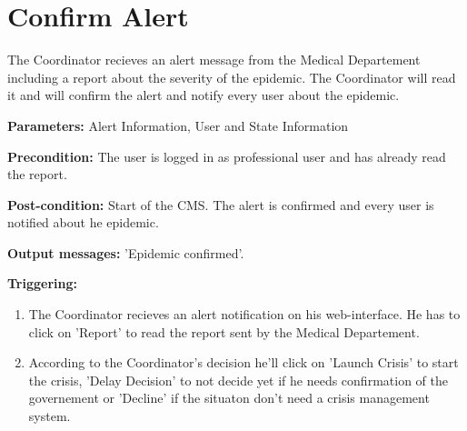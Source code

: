 \section{Confirm Alert}
\label{operation:ConfirmAlert}
The Coordinator recieves an alert message from the Medical Departement
including a report about the severity of the epidemic. The Coordinator will
read it and will confirm the alert and notify every user about the epidemic.\\
\begin{description}
\item \textbf{Parameters:} Alert Information, User and State Information
\item \textbf{Precondition:} The user is logged in as professional user and
has already read the report.
\item \textbf{Post-condition:} Start of the CMS. The alert is confirmed and
every user is notified about he epidemic.
\item \textbf{Output messages:} 'Epidemic confirmed'.
\item \textbf{Triggering:}
\begin{enumerate}
\item The Coordinator recieves an alert notification on his web-interface. He
has to click on 'Report' to read the report sent by the Medical Departement.
\item According to the Coordinator's decision he'll click on 'Launch Crisis' to
start the crisis, 'Delay Decision' to not decide yet if he needs confirmation of
the governement or 'Decline' if the situaton don't need a crisis
management system.
\end{enumerate}
\end{description}

